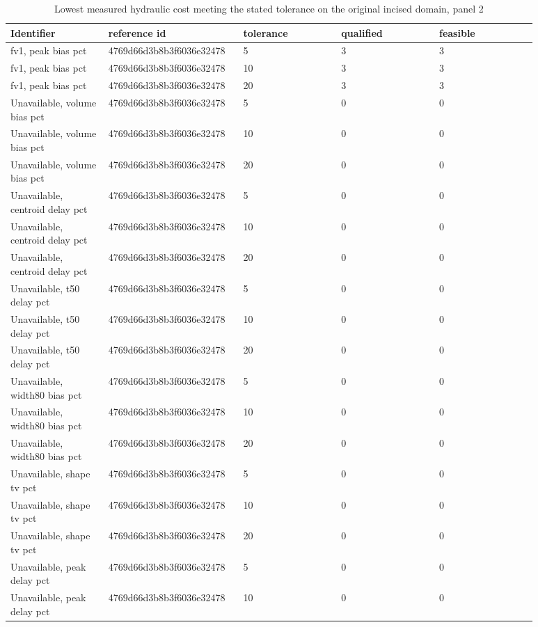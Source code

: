 \begin{longtable}{p{0.1760\linewidth}p{0.1760\linewidth}p{0.1760\linewidth}p{0.1760\linewidth}p{0.1760\linewidth}}
\caption{Lowest measured hydraulic cost meeting the stated tolerance on the original incised domain, panel 2}\\
\hline
Identifier & reference id & tolerance & qualified & feasible \\
\hline\endhead
fv1, peak bias pct & 4769d66d3b8b3f6036e32478 & 5 & 3 & 3 \\
fv1, peak bias pct & 4769d66d3b8b3f6036e32478 & 10 & 3 & 3 \\
fv1, peak bias pct & 4769d66d3b8b3f6036e32478 & 20 & 3 & 3 \\
Unavailable, volume bias pct & 4769d66d3b8b3f6036e32478 & 5 & 0 & 0 \\
Unavailable, volume bias pct & 4769d66d3b8b3f6036e32478 & 10 & 0 & 0 \\
Unavailable, volume bias pct & 4769d66d3b8b3f6036e32478 & 20 & 0 & 0 \\
Unavailable, centroid delay pct & 4769d66d3b8b3f6036e32478 & 5 & 0 & 0 \\
Unavailable, centroid delay pct & 4769d66d3b8b3f6036e32478 & 10 & 0 & 0 \\
Unavailable, centroid delay pct & 4769d66d3b8b3f6036e32478 & 20 & 0 & 0 \\
Unavailable, t50 delay pct & 4769d66d3b8b3f6036e32478 & 5 & 0 & 0 \\
Unavailable, t50 delay pct & 4769d66d3b8b3f6036e32478 & 10 & 0 & 0 \\
Unavailable, t50 delay pct & 4769d66d3b8b3f6036e32478 & 20 & 0 & 0 \\
Unavailable, width80 bias pct & 4769d66d3b8b3f6036e32478 & 5 & 0 & 0 \\
Unavailable, width80 bias pct & 4769d66d3b8b3f6036e32478 & 10 & 0 & 0 \\
Unavailable, width80 bias pct & 4769d66d3b8b3f6036e32478 & 20 & 0 & 0 \\
Unavailable, shape tv pct & 4769d66d3b8b3f6036e32478 & 5 & 0 & 0 \\
Unavailable, shape tv pct & 4769d66d3b8b3f6036e32478 & 10 & 0 & 0 \\
Unavailable, shape tv pct & 4769d66d3b8b3f6036e32478 & 20 & 0 & 0 \\
Unavailable, peak delay pct & 4769d66d3b8b3f6036e32478 & 5 & 0 & 0 \\
Unavailable, peak delay pct & 4769d66d3b8b3f6036e32478 & 10 & 0 & 0 \\

\end{longtable}
